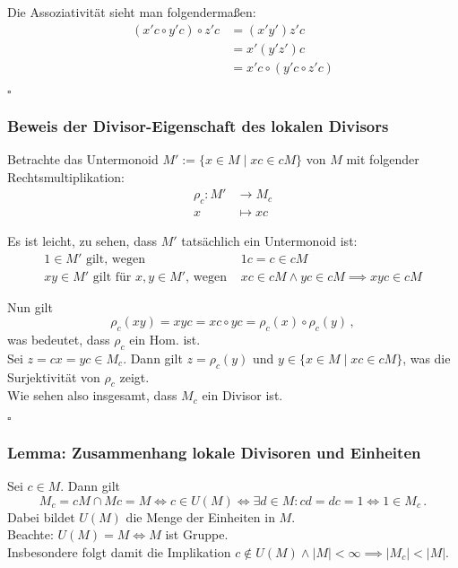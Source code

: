 \documentclass[12pt, german]{article}
\newcommand{\bewiesen}{
	
	\begin{flushright}
		$\square$  \\
\end{flushright}}
\begin{document}
	Die Assoziativität sieht man folgenderma\ss en:
	\begin{align*}
		(x'c \circ y'c)\circ z'c &= (x'y')z'c \\
		&= x'(y'z')c \\
		&= x'c \circ (y'c \circ z'c)
	\end{align*}
	\bewiesen
	
	\subsubsection{Beweis der Divisor-Eigenschaft des lokalen Divisors}
	Betrachte das Untermonoid $M' :=\{x \in M \mid xc \in cM\}$ von $M$ mit folgender Rechtsmultiplikation:
	\begin{align*}
		\rho_c: M' &\to M_c\\
		x &\mapsto xc
	\end{align*}
	
	Es ist leicht, zu sehen, dass $M'$ tatsächlich ein Untermonoid ist:
	\begin{align*}
		1 \in M' \text{ gilt, wegen }& 1c=c\in cM\\
		xy \in M' \text{ gilt für } x, y \in M'\text{, wegen }& xc \in cM \wedge yc \in cM \implies xyc \in cM
	\end{align*}
	
	 Nun gilt $$\rho_c(xy) = xyc = xc \circ yc = \rho_c(x) \circ \rho_c(y)\, ,$$ was bedeutet, dass $\rho_c$ ein Hom. ist.\\

	Sei $z = cx = yc \in M_c$. 
	Dann gilt $z = \rho_c(y)$ und $y \in \{x \in M \mid xc \in cM\}$, was die Surjektivität von $\rho_c$ zeigt.\\
	
	Wie sehen also insgesamt, dass $M_c$ ein Divisor ist.
	\bewiesen
	
	\subsubsection{Lemma: Zusammenhang lokale Divisoren und Einheiten}
	Sei $c\in M$. Dann gilt $$M_c = cM \cap Mc = M \iff c \in U(M) \iff \exists d \in M : cd = dc = 1 \iff 1 \in M_c\, .$$
	Dabei bildet $U(M)$ die Menge der Einheiten in $M$.\\
	Beachte: $U(M) = M \iff M$ ist Gruppe. \\
	
	Insbesondere folgt damit die Implikation $c \notin U(M) \wedge |M| < \infty \implies |M_c| < |M|$.
	
\end{document}
